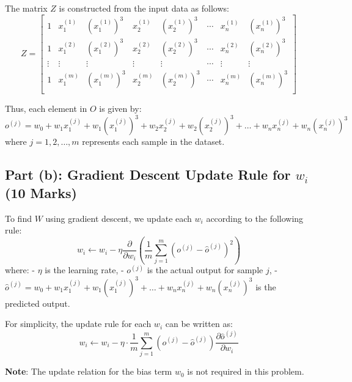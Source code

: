 \documentclass{article}
\begin{document}
	The matrix \( Z \) is constructed from the input data as follows:
	\[
	Z = \begin{bmatrix}
		1 & x_{1}^{(1)} & \left( x_{1}^{(1)} \right)^3 & x_{2}^{(1)} & \left( x_{2}^{(1)} \right)^3 & \cdots & x_{n}^{(1)} & \left( x_{n}^{(1)} \right)^3 \\
		1 & x_{1}^{(2)} & \left( x_{1}^{(2)} \right)^3 & x_{2}^{(2)} & \left( x_{2}^{(2)} \right)^3 & \cdots & x_{n}^{(2)} & \left( x_{n}^{(2)} \right)^3 \\
		\vdots & \vdots & \vdots & \vdots & \vdots & \cdots & \vdots & \vdots \\
		1 & x_{1}^{(m)} & \left( x_{1}^{(m)} \right)^3 & x_{2}^{(m)} & \left( x_{2}^{(m)} \right)^3 & \cdots & x_{n}^{(m)} & \left( x_{n}^{(m)} \right)^3 \\
	\end{bmatrix}
	\]
	
	Thus, each element in \( O \) is given by:
	\[
	o^{(j)} = w_0 + w_1 x_1^{(j)} + w_1 \left( x_1^{(j)} \right)^3 + w_2 x_2^{(j)} + w_2 \left( x_2^{(j)} \right)^3 + \dots + w_n x_n^{(j)} + w_n \left( x_n^{(j)} \right)^3
	\]
	where \( j = 1, 2, \dots, m \) represents each sample in the dataset.
	
	\subsection*{Part (b): Gradient Descent Update Rule for \( w_i \) (10 Marks)}
	
	To find \( W \) using gradient descent, we update each \( w_i \) according to the following rule:
	\[
	w_i \leftarrow w_i - \eta \frac{\partial}{\partial w_i} \left( \frac{1}{m} \sum_{j=1}^{m} \left( o^{(j)} - \hat{o}^{(j)} \right)^2 \right)
	\]
	where:
	- \( \eta \) is the learning rate,
	- \( o^{(j)} \) is the actual output for sample \( j \),
	- \( \hat{o}^{(j)} = w_0 + w_1 x_1^{(j)} + w_1 \left( x_1^{(j)} \right)^3 + \dots + w_n x_n^{(j)} + w_n \left( x_n^{(j)} \right)^3 \) is the predicted output.
	
	For simplicity, the update rule for each \( w_i \) can be written as:
	\[
	w_i \leftarrow w_i - \eta \cdot \frac{1}{m} \sum_{j=1}^{m} \left( o^{(j)} - \hat{o}^{(j)} \right) \frac{\partial \hat{o}^{(j)}}{\partial w_i}
	\]
	
	\textbf{Note}: The update relation for the bias term \( w_0 \) is not required in this problem.
	
	
	
\end{document}
